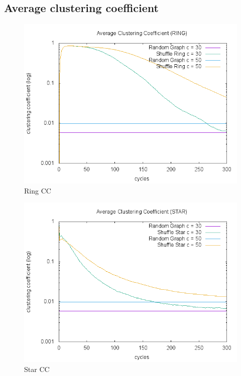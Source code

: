\documentclass[UKenglish]{article}  %
\begin{document}
\subsection{Average clustering coefficient}

\begin{figure}
\includegraphics[scale=0.6]{plot/ringCC.png}
	\caption{Ring CC}
	\label{fig:ringCC}
\end{figure}

\begin{figure}
\includegraphics[scale=0.6]{plot/starCC.png}
	\caption{Star CC}
	\label{fig:starCC}
\end{figure}
\end{document}
